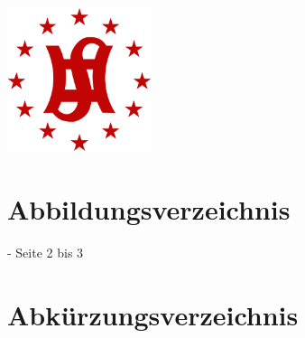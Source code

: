 \documentclass[11pt]{article}
\begin{document}
\begin{titlepage}
    
    \includegraphics[width=120pt, keepaspectratio]{images/sghm}\\[2cm]
     
    
    \vfill
    
    \end{titlepage}


\renewcommand{\contentsname}{Inhaltsverzeichnis}
\renewcommand{\figurename}{Abbildung}
\tableofcontents
\newpage
{}


\section*{Abbildungsverzeichnis}
- Seite 2 bis 3

\newpage


\section*{Abkürzungsverzeichnis}

\begin{acronym}
\end{acronym}
\newpage

\renewcommand\linenumberfont{\normalfont\small}
\setlength\linenumbersep{1cm}
\linenumbers{}
\end{document}
